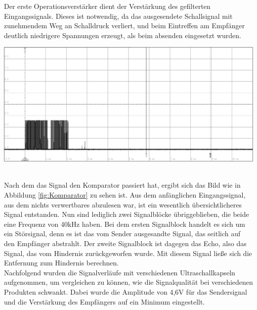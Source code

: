 Der erste Operationsverstärker dient der Verstärkung des gefilterten Eingangssignals. Dieses ist notwendig, da das ausgesendete Schallsignal mit zunehmendem Weg an Schalldruck verliert, und beim Eintreffen am Empfänger deutlich niedrigere Spannungen erzeugt, als beim absenden eingesetzt wurden. \\
\begin{minipage}{0.5\textwidth}
\includegraphics[width=1\textwidth%
]{Abbildungen/MessungenP1/Signal-nach-Komparator.png}
\label{fig:Komparator}
\end{minipage}\\
Nach dem das Signal den Komparator passiert hat, ergibt sich das Bild wie in Abbildung \ref{fig:Komparator} zu sehen ist. Aus dem anfänglichen Eingangssignal, aus dem nichts verwertbares abzulesen war, ist ein wesentlich übersichtlicheres Signal entstanden. Nun sind lediglich zwei Signalblöcke übriggeblieben, die beide eine Frequenz von 40kHz haben. Bei dem ersten Signalblock handelt es sich um ein Störsignal, denn es ist das vom Sender ausgesandte Signal, das seitlich auf den Empfänger abstrahlt. Der zweite Signalblock ist dagegen das Echo, also das Signal, das vom Hindernis zurückgeworfen wurde. Mit diesem Signal ließe sich die Entfernung zum Hindernis berechnen.\\
Nachfolgend wurden die Signalverläufe mit verschiedenen Ultraschallkapseln aufgenommen, um vergleichen zu können, wie die Signalqualität bei verschiedenen Produkten schwankt. Dabei wurde die Amplitude von 4,6V für das Sendersignal und die Verstärkung des Empfängers auf ein Minimum eingestellt.\\
